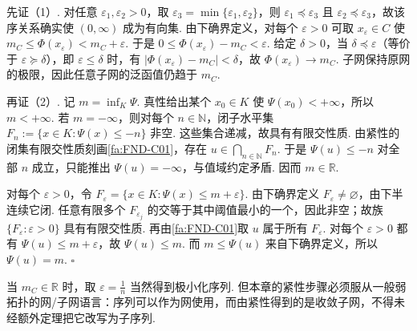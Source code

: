 \begin{FAProof}
先证（1）. 对任意 \(\displaystyle\varepsilon_1,\varepsilon_2>0\)，取 \(\displaystyle\varepsilon_3=\min\{\varepsilon_1,\varepsilon_2\}\)，则 \(\displaystyle\varepsilon_1\preceq\varepsilon_3\) 且 \(\displaystyle\varepsilon_2\preceq\varepsilon_3\)，故该序关系确实使 \(\displaystyle(0,\infty)\) 成为有向集. 由下确界定义，对每个 \(\displaystyle\varepsilon>0\) 可取 \(\displaystyle x_\varepsilon\in C\) 使
\(\displaystyle m_C \leqslant \Phi(x_\varepsilon) < m_C+\varepsilon\).
于是 \(\displaystyle0\leqslant\Phi(x_\varepsilon)-m_C<\varepsilon\). 给定 \(\displaystyle\delta>0\)，当 \(\displaystyle\delta\preceq\varepsilon\)（等价于 \(\displaystyle\varepsilon\succeq\delta\)），即 \(\displaystyle\varepsilon\leqslant\delta\) 时，有 \(\displaystyle|\Phi(x_\varepsilon)-m_C|<\delta\)，故 \(\displaystyle\Phi(x_\varepsilon)\to m_C\). 子网保持原网的极限，因此任意子网的泛函值仍趋于 \(\displaystyle m_C\).

再证（2）. 记 \(\displaystyle m=\inf_K\Psi\). 真性给出某个 \(\displaystyle x_0\in K\) 使 \(\displaystyle\Psi(x_0)<+\infty\)，所以 \(\displaystyle m<+\infty\). 若 \(\displaystyle m=-\infty\)，则对每个 \(\displaystyle n\in\mathbb N\)，闭子水平集
\(\displaystyle F_n:=\{x\in K:\Psi(x)\leqslant-n\}\)
非空. 这些集合递减，故具有有限交性质. 由紧性的闭集有限交性质刻画\autoref{fa:FND-C01}，存在 \(\displaystyle u\in\bigcap_{n\in\mathbb N}F_n\). 于是 \(\displaystyle\Psi(u)\leqslant-n\) 对全部 \(\displaystyle n\) 成立，只能推出 \(\displaystyle\Psi(u)=-\infty\)，与值域约定矛盾. 因而 \(\displaystyle m\in\mathbb R\).

对每个 \(\displaystyle\varepsilon>0\)，令 \(\displaystyle F_\varepsilon=\{x\in K:\Psi(x)\leqslant m+\varepsilon\}\). 由下确界定义 \(\displaystyle F_\varepsilon\neq\varnothing\)，由下半连续它闭. 任意有限多个 \(\displaystyle F_{\varepsilon_j}\) 的交等于其中阈值最小的一个，因此非空；故族 \(\displaystyle\{F_\varepsilon:\varepsilon>0\}\) 具有有限交性质. 再由\autoref{fa:FND-C01}取 \(\displaystyle u\) 属于所有 \(\displaystyle F_\varepsilon\). 对每个 \(\displaystyle\varepsilon>0\) 都有 \(\displaystyle\Psi(u)\leqslant m+\varepsilon\)，故 \(\displaystyle\Psi(u)\leqslant m\). 而 \(\displaystyle m\leqslant\Psi(u)\) 来自下确界定义，所以 \(\displaystyle\Psi(u)=m\).
\hfill\(\square\)
\end{FAProof}

\begin{FARemark}[极小化序列与极小化网]
当 \(\displaystyle m_C\in\mathbb R\) 时，取 \(\displaystyle\varepsilon=\frac{1}{n}\) 当然得到极小化序列. 但本章的紧性步骤必须服从一般弱拓扑的网/子网语言：序列可以作为网使用，而由紧性得到的是收敛子网，不得未经额外定理把它改写为子序列.
\end{FARemark}

